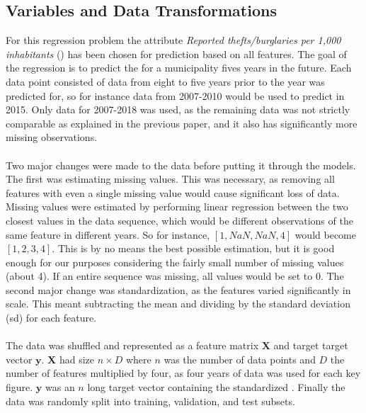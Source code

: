\subsection{Variables and Data Transformations}
For this regression problem the attribute \textit{Reported thefts/burglaries per 1,000 inhabitants} () has been chosen for prediction based on all features.
The goal of the regression is to predict the  for a municipality fives years in the future. Each data point consisted of data from eight to five years prior to the year  was predicted for, so for instance data from 2007-2010 would be used to predict  in 2015. Only data for 2007-2018 was used, as the remaining data was not strictly comparable as explained in the previous paper, and it also has significantly more missing observations.
\\\\
Two major changes were made to the data before putting it through the models. The first was estimating missing values. This was necessary, as removing all features with even a single missing value would cause significant loss of data. Missing values were estimated by performing linear regression between the two closest values in the data sequence, which would be different observations of the same feature in different years. So for instance, $ [1, NaN, NaN, 4] $ would become $ [1, 2, 3, 4] $. This is by no means the best possible estimation, but it is good enough for our purposes considering the fairly small number of missing values (about 4\pro). If an entire sequence was missing, all values would be set to 0. The second major change was standardization, as the features varied significantly in scale. This meant subtracting the mean and dividing by the standard deviation (sd) for each feature.\\
\\
The data was shuffled and represented as a feature matrix $ \mathbf X $ and target target vector $ \mathbf y $. $ \mathbf X $ had size $ n\times D $ where $ n $ was the number of data points and $ D $ the number of features multiplied by four, as four years of data was used for each key figure. $ \mathbf y $ was an $ n $ long target vector containing the standardized . Finally the data was randomly split into training, validation, and test subsets.


